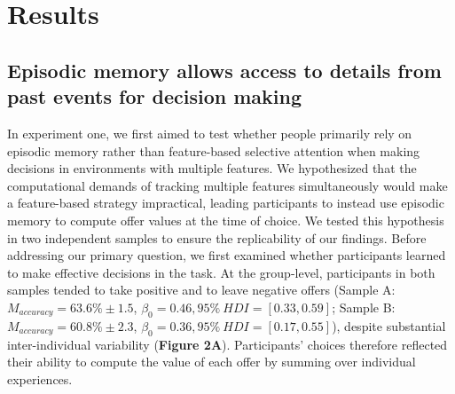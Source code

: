 \documentclass[10pt,letterpaper]{article}
\begin{document}
\begin{figure}[t]
    \label{fig:figure2}
\end{figure}

\section{Results}

\subsection{Episodic memory allows access to details from past events for decision making}

In experiment one, we first aimed to test whether people primarily rely on episodic memory rather than feature-based selective attention when making decisions in environments with multiple features. We hypothesized that the computational demands of tracking multiple features simultaneously would make a feature-based strategy impractical, leading participants to instead use episodic memory to compute offer values at the time of choice. We tested this hypothesis in two independent samples to ensure the replicability of our findings. Before addressing our primary question, we first examined whether participants learned to make effective decisions in the task. At the group-level, participants in both samples tended to take positive and to leave negative offers (Sample A: $M_{accuracy} = 63.6\% \pm 1.5$, $\beta_{0} = 0.46, 95\% \ HDI = [0.33, 0.59]$; Sample B: $M_{accuracy} = 60.8\% \pm 2.3$, $\beta_{0} = 0.36, 95\% \ HDI = [0.17, 0.55]$), despite substantial inter-individual variability (\textbf{Figure 2A}). Participants' choices therefore reflected their ability to compute the value of each offer by summing over individual experiences.
\end{document}
